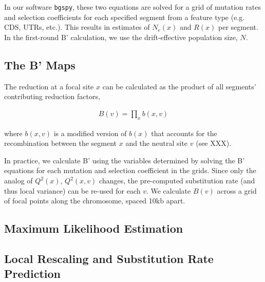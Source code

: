 \documentclass[11pt]{article}
\begin{document}
In our software \texttt{bgspy}, these two equations are solved for a grid of
mutation rates and selection coefficients for each specified segment from a
feature type (e.g. CDS, UTRs, etc.). This results in estimates of $N_e(x)$ and
$R(x)$ per segment. In the first-round B' calculation, we use the
drift-effective population size, $N$.

\subsection*{The B' Maps}

The reduction at a focal site $x$ can be calculated as the product of all
segments' contributing reduction factors, 

\begin{align}
  B(v) = \prod_x b(x,v)
\end{align}

where $b(x, v)$ is a modified version of $b(x)$ that accounts for the
recombination between the segment $x$ and the neutral site $v$ (see XXX).

In practice, we calculate B' using the variables determined by solving the B'
equations for each mutation and selection coefficient in the grids. Since only
the analog of $Q^2(x)$, $Q^2(x, v)$ changes, the pre-computed substitution rate
(and thus local variance) can be re-used for each $v$. We calculate $B(v)$
across a grid of focal points along the chromosome, spaced 10kb apart.

\subsection*{Maximum Likelihood Estimation}

\subsection*{Local Rescaling and Substitution Rate Prediction}









\end{document}
